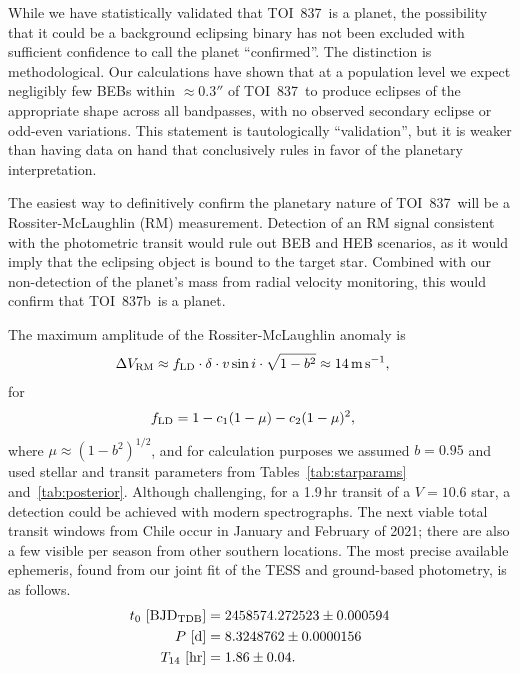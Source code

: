 \documentclass[12pt,twocolumn,tighten]{aastex63}
\newcommand{\tn}{TOI~837} %
\newcommand{\pn}{TOI~837b} %
\begin{document}
While we have statistically validated that \tn\ is a planet, the
possibility that it could be a background eclipsing binary has not
been excluded with sufficient confidence to call the planet
``confirmed''.  The distinction is methodological.  Our calculations
have shown that at a population level we expect negligibly few BEBs
within $\approx0.3''$ of \tn\ to produce eclipses of the appropriate
shape across all bandpasses, with no observed secondary eclipse or
odd-even variations.  This statement is
tautologically ``validation'', but it is weaker than having data on
hand that conclusively rules in favor of the planetary interpretation.

The easiest way to definitively confirm the planetary nature of \tn\
will be a Rossiter-McLaughlin (RM) measurement.  Detection of an RM
signal consistent with the photometric transit would rule out BEB and
HEB scenarios, as it would imply that the eclipsing object is bound to
the target star. Combined with our non-detection of the planet's mass
from radial velocity monitoring, this would confirm that \pn\ is a
planet.

The maximum amplitude of the Rossiter-McLaughlin anomaly is
\citep{gaudi_prospects_2007}
\begin{align}
  \Delta V_{\rm RM} &\approx f_{\rm LD} \cdot \delta \cdot v\sin i \cdot \sqrt{1-b^2}
  \approx 14\,{\rm m\,s}^{-1},
\end{align}
for
\begin{align}
  f_{\rm LD} &= 1 - c_1 ( 1 - \mu ) - c_2 (1 - \mu )^2,
\end{align}
where $\mu \approx (1 - b^2)^{1/2}$, and for calculation purposes we
assumed $b=0.95$ and used stellar and transit parameters from
Tables~\ref{tab:starparams} and~\ref{tab:posterior}.  Although
challenging, for a 1.9$\,$hr transit of a $V=10.6$ star, a detection
could be achieved with modern spectrographs.  The next viable total
transit windows from Chile occur in January and February of 2021;
there are also a few visible per season from other southern locations.
The most precise available ephemeris, found from our joint fit of the
TESS and ground-based photometry, is as follows.
\begin{align}
  t_0\ [{\rm BJD_{TDB}}] &= 2458574.272523 \pm 0.000594 \nonumber \\
  P\ [{\rm d}] &= 8.3248762 \pm 0.0000156 \nonumber \\
  T_{14}\ [{\rm hr}] &= 1.86 \pm 0.04.
  \label{eq:ephem}
\end{align}
\end{document}
